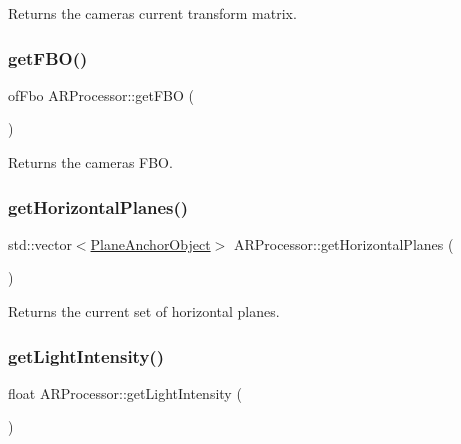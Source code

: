 Returns the camera\textquotesingle{}s current transform matrix. 

\mbox{\label{class_a_r_processor_a8436dc786e91fb933879d90a4ab396d5}} 
\subsubsection{\texorpdfstring{get\+F\+B\+O()}{getFBO()}}
{\footnotesize\ttfamily of\+Fbo A\+R\+Processor\+::get\+F\+BO (\begin{DoxyParamCaption}{ }\end{DoxyParamCaption})\hspace{0.3cm}{\ttfamily [inline]}}



Returns the camera\textquotesingle{}s F\+BO. 

\mbox{\label{class_a_r_processor_a3cd70af245be375d56a06e2ea8d068f9}} 
\subsubsection{\texorpdfstring{get\+Horizontal\+Planes()}{getHorizontalPlanes()}}
{\footnotesize\ttfamily std\+::vector$<$\hyperlink{struct_a_r_objects_1_1_plane_anchor_object}{Plane\+Anchor\+Object}$>$ A\+R\+Processor\+::get\+Horizontal\+Planes (\begin{DoxyParamCaption}{ }\end{DoxyParamCaption})\hspace{0.3cm}{\ttfamily [inline]}}



Returns the current set of horizontal planes. 

\mbox{\label{class_a_r_processor_a3e6d897db3a54b004f3eac337110765e}} 
\subsubsection{\texorpdfstring{get\+Light\+Intensity()}{getLightIntensity()}}
{\footnotesize\ttfamily float A\+R\+Processor\+::get\+Light\+Intensity (\begin{DoxyParamCaption}{ }\end{DoxyParamCaption})}



